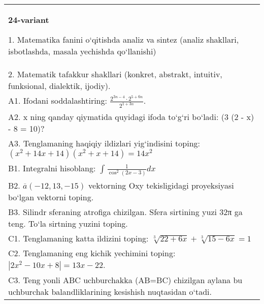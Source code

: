 \documentclass{article}
\begin{document}
\begin{tabular}{m{17cm}}
\textbf{24-variant}

1. Matematika fanini o‘qitishda analiz va sintez (analiz shakllari, isbotlashda, masala yechishda qo‘llanishi) \\
2. Matematik tafakkur shakllari (konkret, abstrakt, intuitiv, funksional, dialektik, ijodiy). \\
A1. Ifodani soddalashtiring: \(\frac{2^{3n - 4} \cdot 2^{5 + 6n}}{2^{1 + 3n}}\). \\
A2. x ning qanday qiymatida quyidagi ifoda to‘g‘ri bo‘ladi: (3 (2 - x) - 8 = 10)? \\
A3. Tenglamaning haqiqiy ildizlari yig‘indisini toping: \((x^2 + 14x + 14) (x^2 + x + 14) = 14x^2\) \\
B1. Integralni hisoblang: \(\int_{}^{}{\frac{1}{\cos^{2} (2x - 3) }dx}\) \\
B2. \(\overline{a} (- 12,13, - 15) \) vektorning Oxy tekisligidagi proyeksiyasi bo‘lgan vektorni toping. \\
B3. Silindr sferaning atrofiga chizilgan. Sfera sirtining yuzi 32π ga teng. To‘la sirtning yuzini toping. \\
C1. Tenglamaning katta ildizini toping: \(\sqrt[3]{22 + 6x} + \sqrt[3]{15 - 6x} = 1\) \\
C2. Tenglamaning eng kichik yechimini toping: \(\left| 2x^2 - 10x + 8 \right| = 13x - 22\). \\
C3. Teng yonli ABC uchburchakka (AB=BC) chizilgan aylana bu uchburchak balandliklarining kesishish nuqtasidan o‘tadi. \\

\end{tabular}
\vspace{1cm}
\end{document}

